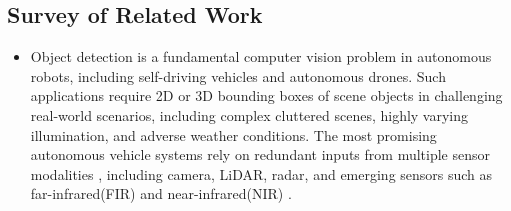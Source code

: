 \documentclass[rnd]{mas_proposal}
\begin{document}
\subsection{Survey of Related Work}
\begin{itemize}
      


      
      \item Object detection is a fundamental computer vision problem in autonomous robots, including self-driving vehicles and autonomous drones. Such applications require 2D or 3D bounding boxes of scene objects in challenging real-world scenarios, including complex cluttered scenes, highly varying illumination, and adverse weather conditions. The most promising autonomous vehicle systems rely on redundant inputs from multiple sensor modalities \cite{caesar2020nuscenes} \cite{sun2020scalability} \cite{ziegler2014making}, including camera, LiDAR, radar, and emerging sensors such as far-infrared(FIR) and near-infrared(NIR) \cite{bijelic2020seeing}.


\end{itemize}
\end{document}
